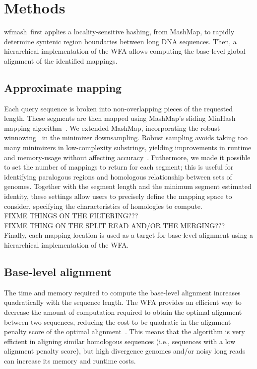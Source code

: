 \documentclass{bioinfo}
\newcommand{\wfmash}{wfmash}
\begin{document}


    \section{Methods}

    \wfmash\ first applies a locality-sensitive hashing, from MashMap, to rapidly determine syntenic region
    boundaries between long DNA sequences. Then, a hierarchical implementation of the WFA allows computing the
    base-level global alignment of the identified mappings.

    \subsection{Approximate mapping}

    Each query sequence is broken into non-overlapping pieces of the requested length. These segments are then
    mapped using MashMap's sliding MinHash mapping algorithm~\citep{30423094}. We extended MashMap, incorporating
    the robust winnowing~\citep{Schleimer S. et al. (2003)} in the minimizer downsampling.
    Robust sampling avoids taking too many minimizers in low-complexity substrings, yielding improvements in
    runtime and memory-usage without affecting accuracy~\citep{32657365}. Futhermore, we made it possible
    to set the number of mappings to return for each segment; this is useful for identifying paralogous regions and
    homologous relationship between sets of genomes. Together with the segment length and the minimum segment
    estimated identity, these settings allow users to precisely define the mapping space to consider,
    specifying the characteristics of homologies to compute.
    \\

    FIXME THINGS ON THE FILTERING???\\

    FIXME THING ON THE SPLIT READ AND/OR THE MERGING???\\

    Finally, each mapping location is used as a target for base-level alignment using a hierarchical implementation
    of the WFA.


    \subsection{Base-level alignment}

    The time and memory required to compute the base-level alignment increases quadratically with the sequence
    length. The WFA provides an efficient way to decrease the amount of computation required to obtain the
    optimal alignment between two sequences, reducing the cost to be quadratic in the alignment penalty score
    of the optimal alignment~\citep{32915952}. This means that the algorithm is very efficient in aligning
    similar homologous sequences (i.e., sequences with a low alignment penalty score), but high divergence
    genomes and/or noisy long reads can increase its memory and runtime costs.
\end{document}
